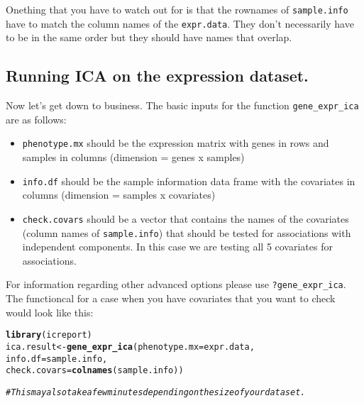 \documentclass[11pt, oneside]{article}\usepackage[]{graphicx}\usepackage[]{color}
\makeatletter
\newcommand{\hlcom}[1]{\textcolor[rgb]{0.678,0.584,0.686}{\textit{#1}}}%
\newcommand{\hlstd}[1]{\textcolor[rgb]{0.345,0.345,0.345}{#1}}%
\newcommand{\hlkwb}[1]{\textcolor[rgb]{0.69,0.353,0.396}{#1}}%
\newcommand{\hlkwc}[1]{\textcolor[rgb]{0.333,0.667,0.333}{#1}}%
\newcommand{\hlkwd}[1]{\textcolor[rgb]{0.737,0.353,0.396}{\textbf{#1}}}%
\newenvironment{kframe}{%
 \def\at@end@of@kframe{}%
 \ifinner\ifhmode%
  \def\at@end@of@kframe{\end{minipage}}%
  \begin{minipage}{\columnwidth}%
 \fi\fi%
 \def\FrameCommand##1{\hskip\@totalleftmargin \hskip-\fboxsep
 \colorbox{shadecolor}{##1}\hskip-\fboxsep
     \hskip-\linewidth \hskip-\@totalleftmargin \hskip\columnwidth}%
 \MakeFramed {\advance\hsize-\width
   \@totalleftmargin\z@ \linewidth\hsize
   \@setminipage}}%
 {\par\unskip\endMakeFramed%
 \at@end@of@kframe}
\newenvironment{knitrout}{}{} %
\makeatother
\begin{document}
Onething that you have to watch out for is that the rownames of \verb|sample.info| have to match the column names of the \verb|expr.data|. They don't necessarily have to be in the same order but they should have names that overlap.


\subsection{Running ICA on the expression dataset.}

Now let's get down to business. The basic inputs for the function \verb|gene_expr_ica| are as follows:

\begin{itemize}

  \item \verb|phenotype.mx| should be the expression matrix with genes in rows and samples in columns (dimension = genes x samples)

  \item \verb|info.df| should be the sample information data frame with the covariates in columns (dimension = samples x covariates)

  \item \verb|check.covars| should be a vector that contains the names of the covariates (column names of \verb|sample.info|) that should be tested for associations with independent components. In this case we are testing all 5 covariates for associations.
\end{itemize}

For information regarding other advanced options please use \verb|?gene_expr_ica|. The functioncal for a case when you have covariates that you want to check would look like this:

\begin{knitrout}
\color{fgcolor}\begin{kframe}
\begin{alltt}
\hlkwd{library}\hlstd{(icreport)}
\hlstd{ica.result} \hlkwb{<-} \hlkwd{gene_expr_ica}\hlstd{(}\hlkwc{phenotype.mx} \hlstd{= expr.data,}
                            \hlkwc{info.df} \hlstd{= sample.info,}
                            \hlkwc{check.covars} \hlstd{=} \hlkwd{colnames}\hlstd{(sample.info))}

\hlcom{# This may also take a few minutes depending on the size of your dataset.}
\end{alltt}
\end{kframe}
\end{knitrout}
\end{document}
